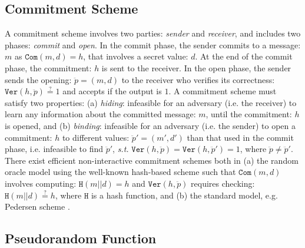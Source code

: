 \subsection{Commitment Scheme} A commitment scheme involves two parties:  \emph{sender} and  \emph{receiver}, and includes  two phases: \emph{commit} and  \emph{open}. In the commit phase, the sender  commits to a message: $m$ as $\mathtt{Com}(m,d)=h$, that involves a secret value: $d$. At the end of the commit phase,  the commitment: $h$ is sent to the receiver. In the open phase, the sender sends the opening: $\ddot{p}=(m,d)$ to the receiver who verifies its correctness: $\mathtt{Ver}(h,\ddot{p})\stackrel{\scriptscriptstyle ?}=1$ and accepts if the output is $1$.  A commitment scheme must satisfy two properties: (a) \textit{hiding}: infeasible for an adversary (i.e. the receiver) to learn any information about the committed  message: $m$, until the commitment: $h$ is opened, and (b) \textit{binding}:   infeasible for an adversary (i.e. the sender) to open a commitment: $h$ to different values: $\ddot{p}'=(m',d')$ than that used in the commit phase, i.e. infeasible to find  $\ddot{p}'$, \textit{s.t.} $\mathtt{Ver}(h,\ddot{p})=\mathtt{Ver}(h,\ddot{p}')=1$, where $\ddot{p}\neq \ddot{p}'$.  There exist efficient non-interactive  commitment schemes both in (a) the random oracle model using the well-known hash-based scheme such that $\mathtt{Com}(m,d)$ involves computing: $\mathtt{H}(m||d)=h$ and $\mathtt{Ver}(h,\ddot{p})$ requires checking: $\mathtt{H}(m||d)\stackrel{\scriptscriptstyle ?}=h$, where $\mathtt{H}$ is a hash function, and (b)  the standard model, e.g. Pedersen scheme \cite{Pedersen91}. 





\subsection{Pseudorandom Function}


